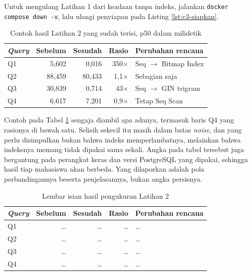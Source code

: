 Untuk mengulang Latihan 1 dari keadaan tanpa indeks, jalankan
\texttt{docker compose down -v}, lalu ulangi penyiapan pada Listing
\ref{lst:c3-siapkan}.

\begin{table}[!htb]
  \centering
  \caption{Contoh hasil Latihan 2 yang sudah terisi, p50 dalam milidetik}
  \label{tab:c3-lat2-contoh}
  \begin{tabularx}{\textwidth}{lrrrX}
    \hline
    \textbf{\textit{Query}} & \textbf{Sebelum} & \textbf{Sesudah} & \textbf{Rasio} & \textbf{Perubahan rencana} \\
    \hline
    Q1 & 5,602 & 0,016 & 350$\times$ & Seq $\rightarrow$ Bitmap Index \\
    \hline
    Q2 & 88,459 & 80,433 & 1,1$\times$ & Sebagian saja \\
    \hline
    Q3 & 30,839 & 0,714 & 43$\times$ & Seq $\rightarrow$ GIN trigram \\
    \hline
    Q4 & 6,617 & 7,201 & 0,9$\times$ & Tetap Seq Scan \\
    \hline
  \end{tabularx}
\end{table}

Contoh pada Tabel \ref{tab:c3-lat2-contoh} sengaja diambil apa adanya, termasuk
baris Q4 yang rasionya di bawah satu. Selisih sekecil itu masih dalam batas
\textit{noise}, dan yang perlu disimpulkan bukan bahwa indeks memperlambatnya, melainkan
bahwa indeksnya memang tidak dipakai sama sekali. Angka pada tabel tersebut juga
bergantung pada perangkat keras dan versi PostgreSQL yang dipakai, sehingga
hasil tiap mahasiswa akan berbeda. Yang dilaporkan adalah pola perbandingannya
beserta penjelasannya, bukan angka persisnya.

\begin{table}[!htb]
  \centering
  \caption{Lembar isian hasil pengukuran Latihan 2}
  \label{tab:c3-lat2-hasil}
  \begin{tabularx}{\textwidth}{lrrrX}
    \hline
    \textbf{\textit{Query}} & \textbf{Sebelum} & \textbf{Sesudah} & \textbf{Rasio} & \textbf{Perubahan rencana} \\
    \hline
    Q1 & \dots & \dots & \dots & \dots \\
    \hline
    Q2 & \dots & \dots & \dots & \dots \\
    \hline
    Q3 & \dots & \dots & \dots & \dots \\
    \hline
    Q4 & \dots & \dots & \dots & \dots \\
    \hline
  \end{tabularx}
\end{table}

